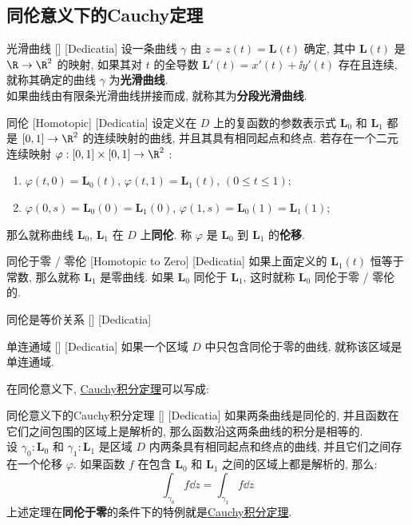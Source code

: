\documentclass[UTF8]{ctexart}
\newcommand{\CauchyThm}{\hyperref[thm:Cauchy]{Cauchy积分定理}}
\begin{document}
\subsection{同伦意义下的Cauchy定理}
\begin{dfn}
    [UUID]
    {光滑曲线}
    []
    [Dedicatia]
    设一条曲线 \( \gamma \) 由 \( z=z(t)=\bm{L}(t) \) 确定, 其中 \( \bm{L}(t) \) 是 \( \R\to\R^2 \) 的映射, 如果其对 \( t \) 的全导数 \( \bm{L}'(t)=x'(t)+\ii y'(t) \) 存在且连续, 就称其确定的曲线 \( \gamma \) 为\textbf{光滑曲线}. \\
    如果曲线由有限条光滑曲线拼接而成, 就称其为\textbf{分段光滑曲线}. 
\end{dfn}
\begin{dfn}
    [UUID]
    {同伦}
    [Homotopic]
    [Dedicatia]
    设定义在 \( D \) 上的复函数的参数表示式 \( \bm{L}_0 \) 和 \( \bm{L}_1 \) 都是 \( [0,1]\to\R^2 \) 的连续映射的曲线, 并且其具有相同起点和终点. 若存在一个二元连续映射 \( \varphi:[0,1]\times[0,1]\to\R^2 \) :
    \begin{enumerate}
        \item  \( \varphi(t,0)=\bm{L}_0(t) \),  \( \varphi(t,1)=\bm{L}_1(t) \),  \( (0\leq t\leq 1) \);
        \item  \( \varphi(0,s)=\bm{L}_0(0)=\bm{L}_1(0) \),  \( \varphi(1,s)=\bm{L}_0(1)=\bm{L}_1(1) \);
    \end{enumerate}
    那么就称曲线 \( \bm{L}_0 \),  \( \bm{L}_1 \) 在 \( D \) 上\textbf{同伦}. 称 \( \varphi \) 是 \( \bm{L}_0 \) 到 \( \bm{L}_1 \) 的\textbf{伦移}. 
\end{dfn}
\begin{dfn}
    [UUID]
    {同伦于零 / 零伦}
    [Homotopic to Zero]
    [Dedicatia]
    如果上面定义的 \( \bm{L}_1(t) \) 恒等于常数, 那么就称 \( \bm{L}_1 \) 是零曲线. 如果 \( \bm{L}_0 \) 同伦于 \( \bm{L}_1 \), 这时就称 \( \bm{L}_0 \) 同伦于零 / 零伦的. 
\end{dfn}
\begin{ppt}
    [UUID]
    {同伦是等价关系}
    []
    [Dedicatia]
\end{ppt}
\begin{dfn}
    [UUID]
    {单连通域}
    []
    [Dedicatia]
    如果一个区域 \( D \) 中只包含同伦于零的曲线, 就称该区域是单连通域. 
\end{dfn}
在同伦意义下, \CauchyThm 可以写成: 
\begin{thm}
    [UUID]
    {同伦意义下的Cauchy积分定理}
    []
    [Dedicatia]
    如果两条曲线是同伦的, 并且函数在它们之间包围的区域上是解析的, 那么函数沿这两条曲线的积分是相等的. \\
    设  \( \gamma_0:\bm{L}_0 \)  和  \( \gamma_1:\bm{L}_1 \)  是区域  \( D \)  内两条具有相同起点和终点的曲线, 并且它们之间存在一个伦移  \( \varphi \). 如果函数 \( f \) 在包含 \( \bm{L}_0 \) 和 \( \bm{L}_1 \) 之间的区域上都是解析的, 那么: 
    \[\int_{\gamma_0}f\dd{z}=\int_{\gamma_1}f\dd{z}\]
    上述定理在\textbf{同伦于零}的条件下的特例就是\CauchyThm.
\end{thm}
\end{document}
